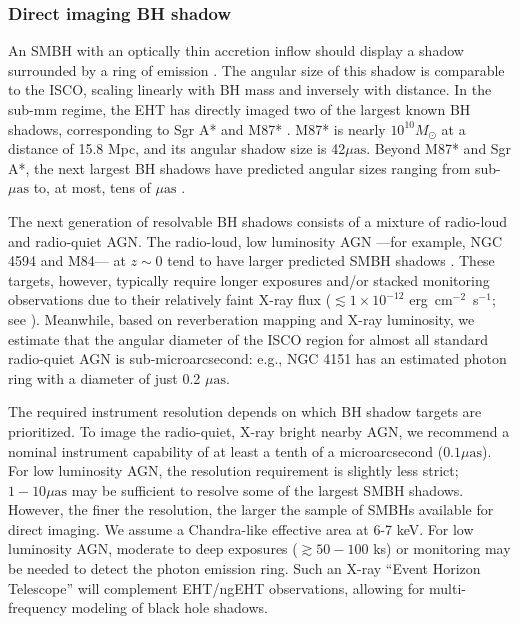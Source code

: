\documentclass[fleqn,10pt]{SelfArx}
\begin{document}
\subsubsection{Direct imaging BH shadow}

An SMBH with an optically thin accretion inflow should display a shadow surrounded by a ring of emission \citep[e.g.,][]{Falcke+2000a}. The angular size of this shadow is comparable to the ISCO, scaling linearly with BH mass and inversely with distance. In the sub-mm regime, the EHT has directly imaged two of the largest known BH shadows, corresponding to Sgr A* and M87* \citep{eht2019:m87i,eht:2022sgrai}. 
M87* is nearly $10^{10} M_{\odot}$ at a distance of 15.8 Mpc, and its angular shadow size is 42$\mu\text{as}$. Beyond M87* and Sgr A*, the next largest BH shadows have predicted angular sizes ranging from sub-$\mu\text{as}$ to, at most, tens of $\mu\text{as}$ \citep{ETHER2023}. 
 
The next generation of resolvable BH shadows consists of a mixture of radio-loud and radio-quiet AGN. The  radio-loud, low luminosity AGN  ---for example, NGC 4594 and M84--- at $z\sim0$ tend to have larger predicted SMBH shadows \citep{2025Zhang}. These targets, however, typically require longer exposures and/or stacked monitoring observations due to their relatively faint X-ray flux ($\lesssim1\times10^{-12}$ erg~cm$^{-2}$~s$^{-1}$; see \citealt{2016Connolly,2023Bambic,2025Ford}). Meanwhile, based on reverberation mapping and X-ray luminosity, we estimate that the angular diameter of the ISCO region for almost all standard radio-quiet AGN is sub-microarcsecond: e.g., NGC 4151 has an estimated photon ring with a diameter of just 0.2 $\mu\text{as}$. 

The required instrument resolution depends on which BH shadow targets are prioritized. To image the radio-quiet, X-ray bright nearby AGN, we recommend a nominal instrument capability of at least a tenth of a microarcsecond ($0.1 \mu\text{as}$). For low luminosity AGN, the resolution requirement is slightly less strict; $1-10 \mu\text{as}$ may be sufficient to resolve some of the largest SMBH shadows. However, the finer the resolution, the larger the sample of SMBHs available for direct imaging. We assume a Chandra-like effective area at 6-7 keV. For low luminosity AGN, moderate to deep exposures ($\gtrsim50-100$ ks) or monitoring may be needed to detect the photon emission ring. Such an X-ray ``Event Horizon Telescope'' will complement EHT/ngEHT observations, allowing for multi-frequency modeling of black hole shadows. 
\end{document}
